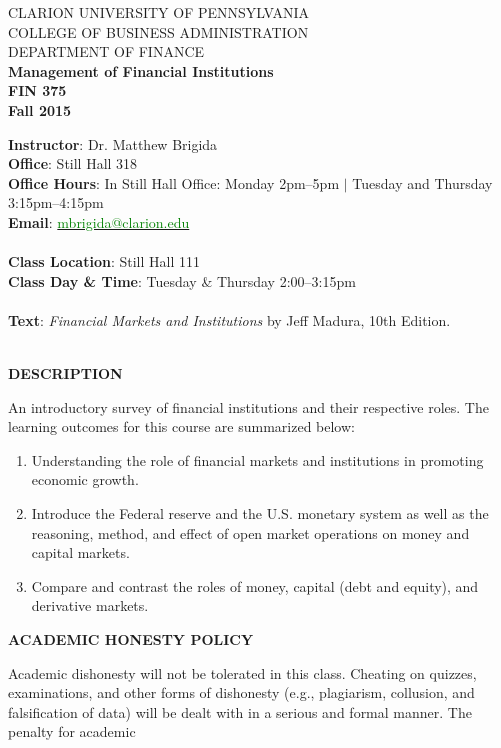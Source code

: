 \documentclass{article}
\begin{document}
\begin{center}
CLARION UNIVERSITY OF PENNSYLVANIA\\
COLLEGE OF BUSINESS ADMINISTRATION\\
DEPARTMENT OF FINANCE
\\
{\bf Management of Financial Institutions}\\
{\bf FIN 375}\\
{\bf Fall 2015}\\
\end{center}
\vspace*{5pt}
{\bf Instructor}: Dr. Matthew Brigida\\
{\bf Office}: Still Hall 318\\
{\bf Office Hours}:  In Still Hall Office:  Monday 2pm--5pm $|$ Tuesday and Thursday 3:15pm--4:15pm\\
{\bf Email}: \href{mailto:mbrigida@clarion.edu}{\textcolor{green}{mbrigida@clarion.edu}}\\
\\
{\bf Class Location}:  Still Hall 111\\
{\bf Class Day \& Time}: Tuesday \& Thursday 2:00--3:15pm \\
\\
{\bf Text}: {\it Financial Markets and Institutions} by Jeff Madura, 10th Edition.
\\
\\
\begin{center}
{\bf DESCRIPTION}
\end{center}  
An introductory survey of financial institutions and their respective roles. The
learning outcomes for this course are summarized below:
\begin{enumerate}
\item  Understanding the role of financial markets and institutions in promoting economic
growth. 
\item Introduce the Federal reserve and the U.S. monetary system as well as the reasoning,
method, and effect of open market operations on money and capital markets.
\item Compare and contrast the roles of money, capital (debt and equity), and derivative markets.
\end{enumerate}
\begin{center}
{\bf ACADEMIC HONESTY POLICY}
\end{center} 
Academic dishonesty will not be tolerated in this class. Cheating
on quizzes, examinations, and other forms of dishonesty (e.g., plagiarism, collusion, and
falsification of data) will be dealt with in a serious and formal manner. The penalty for academic
\end{document}
